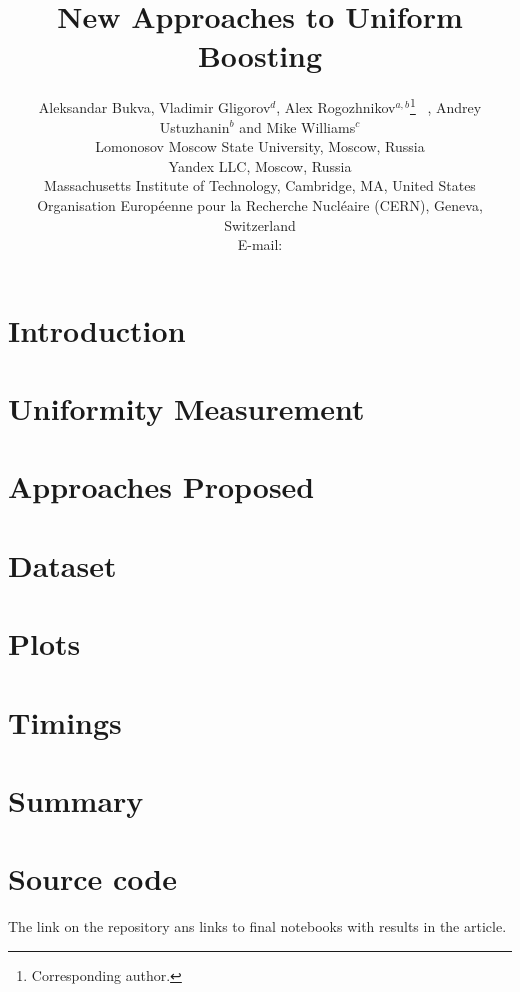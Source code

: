 \documentclass{JINST}
\title{New Approaches to Uniform Boosting}
\author{
Aleksandar Bukva, 
Vladimir Gligorov$^d$,
Alex Rogozhnikov$^{a,b}$\thanks{Corresponding author.}~ ,
Andrey Ustuzhanin$^b$ and
Mike Williams$^c$\\
\llap{$^a$}Lomonosov Moscow State University, Moscow, Russia\\
\llap{$^b$}Yandex LLC, Moscow, Russia\\
\llap{$^c$}Massachusetts Institute of Technology, Cambridge, MA, United States \\
\llap{$^d$}Organisation Europ\'eenne pour la Recherche Nucl\'eaire (CERN), Geneva, Switzerland  \\
E-mail: \email{alex.rogozhnikov@yandex.ru}}
\theoremstyle{definition}
\theoremstyle{remark}
\begin{document}
\maketitle


\section{Introduction}



\section{Uniformity Measurement}



\section{Approaches Proposed}



\section{Dataset}



\section{Plots}



\section{Timings}



\section{Summary}



\section{Source code}

The link on the repository ans links to final notebooks with results in the article.

\acknowledgments
\end{document}
